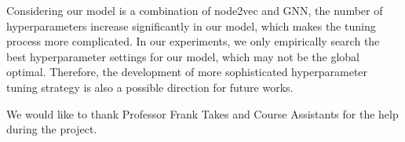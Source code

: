 \documentclass[sigconf]{acmart}
\begin{document}
Considering our model is a combination of node2vec and GNN, the number of hyperparameters increase significantly in our model, which makes the tuning process more complicated. In our experiments, we only empirically search the best hyperparameter settings for our model, which may not be the global optimal. Therefore, the development of more sophisticated hyperparameter tuning strategy is also a possible direction for future works.

\begin{acks}
We would like to thank Professor Frank Takes and Course Assistants for the help during the project.
\end{acks}




\end{document}
